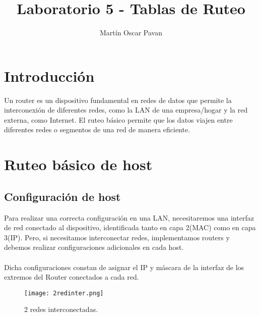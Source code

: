 \documentclass{article}
\title{Laboratorio 5 - Tablas de Ruteo}
\author{Martín Oscar Pavan}
\begin{document}
\maketitle
\section{Introducción}
Un router es un dispositivo fundamental en redes de datos que permite la interconexión de diferentes redes, como la LAN de una empresa/hogar y la red externa, como Internet.
El ruteo básico permite que los datos viajen entre diferentes redes o segmentos de una red de manera eficiente.

\section{Ruteo básico de host}
\subsection{Configuración de host}
Para realizar una correcta configuración en una LAN, necesitaremos una interfaz de red conectado al dispositivo, identificada tanto en capa 2(MAC) como en capa 3(IP).
Pero, si necesitamos interconectar redes, implementamos routers y debemos realizar configuraciones adicionales en cada host.
\\\\
Dicha configuraciones constan de asignar el IP y máscara de la interfaz de los extremos del Router conectados a cada red.
\begin{figure}[H]
    \centering
    \texttt{[image: 2redinter.png]}
    \caption{2 redes interconectadas.}
    \label{fig:enter-label}
\end{figure}
\end{document}
